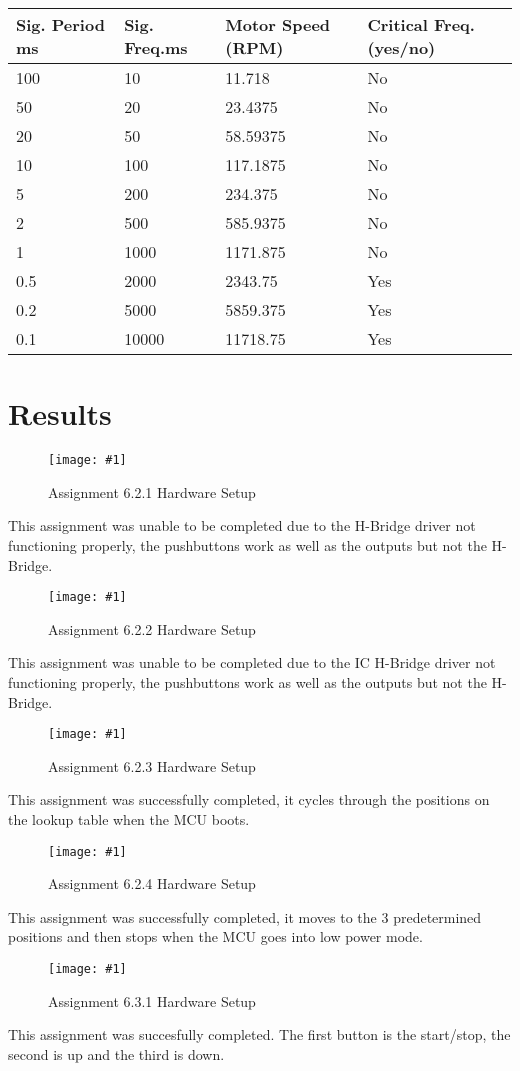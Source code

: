 \documentclass[journal]{IEEEtran}
\newcommand\createfigure[2]{
  \begin{figure}[H]
    \centering \texttt{[image: \#1]}
    \caption{#2}
  \end{figure}}
\begin{document}
\begin{center}
\begin{table}[!h]
  \begin{tabularx}{0.4\textwidth}{|X|X|X|X|}
   \hline
    Sig. Period \si{\milli\second}&Sig. Freq.\si{\milli\second}&Motor Speed (RPM)&Critical Freq. (yes/no)\\
   \hline
    100&10&11.718&No\\
   \hline
    50&20&23.4375&No\\
   \hline
    20&50&58.59375&No\\
   \hline
    10&100&117.1875&No\\
   \hline
    5&200&234.375&No\\
   \hline
    2&500&585.9375&No\\
   \hline
    1&1000&1171.875&No\\
   \hline
    0.5&2000&2343.75&Yes\\
   \hline
    0.2&5000&5859.375&Yes\\
   \hline
    0.1&10000&11718.75&Yes\\
   \hline
  \end{tabularx}
\end{table}
\end{center}
\section{Results}
\createfigure{./Figures/6.2.1.jpeg}{Assignment 6.2.1 Hardware Setup}
This assignment was unable to be completed due to the H-Bridge driver not functioning properly, the pushbuttons work as well as the outputs but not the H-Bridge.
\createfigure{./Figures/6.2.2.jpeg}{Assignment 6.2.2 Hardware Setup}
This assignment was unable to be completed due to the IC H-Bridge driver not functioning properly, the pushbuttons work as well as the outputs but not the H-Bridge.
\createfigure{./Figures/6.2.3.jpeg}{Assignment 6.2.3 Hardware Setup}
This assignment was successfully completed, it cycles through the positions on the lookup table when the MCU boots.
\createfigure{./Figures/6.2.4.jpeg}{Assignment 6.2.4 Hardware Setup}
This assignment was successfully completed, it moves to the 3 predetermined positions and then stops when the MCU goes into low power mode.
\createfigure{./Figures/6.3.1.jpeg}{Assignment 6.3.1 Hardware Setup}
This assignment was succesfully completed. The first button is the start/stop, the second is up and the third is down.
\nocite{rojasEmbeddedSystemsDesign2016}


\end{document}
